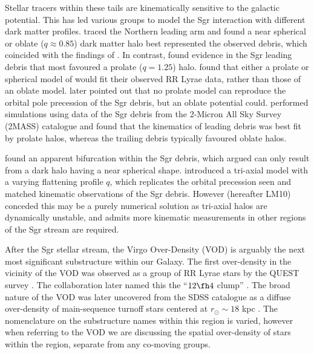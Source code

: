 \documentclass[preprint2]{aastex}
\begin{document}
Stellar tracers within these tails are kinematically sensitive to the galactic potential. This has led various groups to model the Sgr interaction with different dark matter profiles. \citet{Martinez-Delgado;et-al_2004} traced the Northern leading arm and found a near spherical or oblate ($q \approx 0.85$) dark matter halo best represented the observed debris, which coincided with the findings of \citet{Ibata;et-al_2001}. In contrast, \citet{Helmi_2004} found evidence in the Sgr leading debris that most favoured a prolate ($q = 1.25$) halo. \citet{Vivas;et-al_2005} found that either a prolate or spherical model of  \citet{Helmi_2004} would fit their observed RR Lyrae data, rather than those of an oblate model. \citet{Johnston;et-al_2005} later pointed out that no prolate model can reproduce the orbital pole precession of the Sgr debris, but an oblate potential could. \citet[hereafter LJM05]{Law;et-al_2005} performed simulations using data of the Sgr debris from the 2-Micron All Sky Survey (2MASS) catalogue and found that the kinematics of leading debris was best fit by prolate halos, whereas the trailing debris typically favoured oblate halos. 
	
\citet{Belokurov;et-al_2006} found an apparent bifurcation within the Sgr debris, which \citet{Fellhauer;et-al_2006} argued can only result from a dark halo having a near spherical shape. \citet{Law;et-al_2009} introduced a tri-axial model with a varying flattening profile $q$, which replicates the orbital precession seen and matched kinematic observations of the Sgr debris. However \citet{Law;Majewski_2010} (hereafter LM10) conceded this may be a purely numerical solution as tri-axial halos are dynamically unstable, and admits more kinematic measurements in other regions of the Sgr stream are required.

After the Sgr stellar stream, the Virgo Over-Density (VOD) is arguably the next most significant substructure within our Galaxy. The first over-density in the vicinity of the VOD was observed as a group of RR Lyrae stars by the QUEST survey \citep{Vivas;et-al_2001}. The collaboration later named this the ``$12\fh4$ clump'' \citep{Zinn;et-al_2004}. The broad nature of the VOD was later uncovered from the SDSS catalogue as a diffuse over-density of main-sequence turnoff stars centered at $r_\odot \sim18$ kpc \citep[which ][dubbed as S297+63-20.5]{Newberg;et-al_2002}. The nomenclature on the substructure names within this region is varied, however when referring to the VOD we are discussing the spatial over-density of stars within the region, separate from any co-moving groups.
\end{document}
